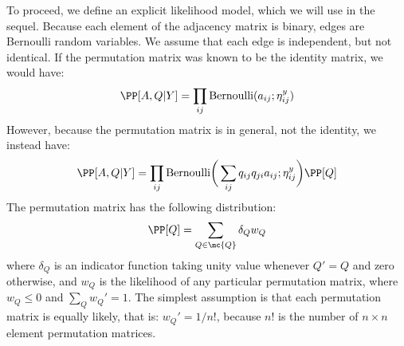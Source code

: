 To proceed, we define an explicit likelihood model, which we will use in the sequel.  Because each element of the adjacency matrix is binary, edges are Bernoulli random variables.  We assume that each edge is independent, but not identical.  If the permutation matrix was known to be the identity matrix, we would have:
\begin{align}
\PP[A,Q|Y] = \prod_{ij} \text{Bernoulli}(a_{ij}; \eta_{ij}^y)
\end{align}
However, because the permutation matrix is in general, not the identity, we instead have:
\begin{align}
\PP[A,Q|Y] = \prod_{ij} \text{Bernoulli}\bigg(\sum_{ij} q_{ij} q_{ji} a_{ij}; \eta_{ij}^y\bigg) \PP[Q]
\end{align}
The permutation matrix has the following distribution:
\begin{align}
	\PP[Q] = \sum_{Q \in \mc{Q}} \delta_Q w_{Q}
\end{align}
where $\delta_Q$ is an indicator function taking unity value whenever $Q'=Q$ and zero otherwise, and $w_Q$ is the likelihood of any particular permutation matrix, where $w_Q\leq 0$ and $\sum_{Q}w_Q'=1$.  The simplest assumption is that each permutation matrix is equally likely, that is: $w_Q'=1/n!$, because $n!$ is the number of $n\times n$ element permutation matrices.  

